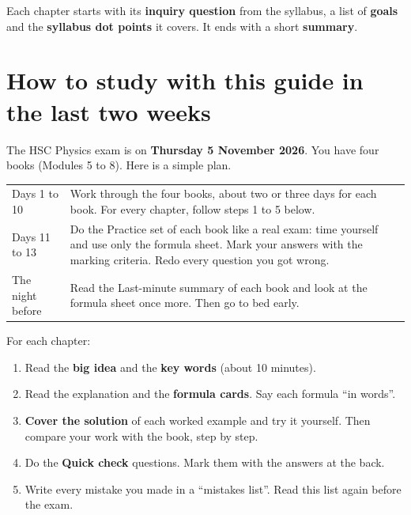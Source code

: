 Each chapter starts with its \textbf{inquiry question} from the syllabus, a
list of \textbf{goals} and the \textbf{syllabus dot points} it covers. It ends
with a short \textbf{summary}.

\section*{How to study with this guide in the last two weeks}

The HSC Physics exam is on \textbf{Thursday 5 November 2026}. You have four
books (Modules 5 to 8). Here is a simple plan.

\begin{table}
  \centering
  \begin{tabular}{@{}L{30mm}L{\dimexpr\linewidth-34mm\relax}@{}}
    \toprule
     & \\
    \midrule
    Days 1 to 10 & Work through the four books, about two or three days for
      each book. For every chapter, follow steps 1 to 5 below.\\
    Days 11 to 13 & Do the Practice set of each book like a real exam: time
      yourself and use only the formula sheet. Mark your answers with the
      marking criteria. Redo every question you got wrong.\\
    The night before & Read the Last-minute summary of each book and look at
      the formula sheet once more. Then go to bed early.\\
    \bottomrule
  \end{tabular}
\end{table}

For each chapter:
\begin{enumerate}
  \item Read the \textbf{big idea} and the \textbf{key words} (about 10 minutes).
  \item Read the explanation and the \textbf{formula cards}. Say each formula
        ``in words''.
  \item \textbf{Cover the solution} of each worked example and try it yourself.
        Then compare your work with the book, step by step.
  \item Do the \textbf{Quick check} questions. Mark them with the answers at the
        back.
  \item Write every mistake you made in a ``mistakes list''. Read this list
        again before the exam.
\end{enumerate}

